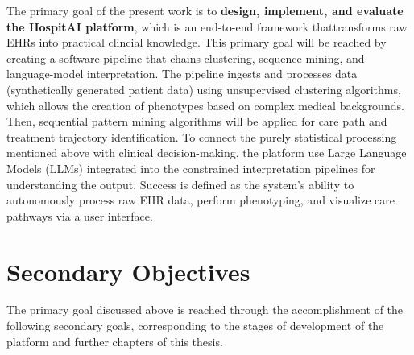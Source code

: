The primary goal of the present work is to \textbf{design, implement, and evaluate the HospitAI platform}, which is an end-to-end framework thattransforms raw EHRs into practical clincial knowledge. This primary goal will be reached by creating a software pipeline that chains clustering, sequence mining, and language-model interpretation. The pipeline ingests and processes data (synthetically generated patient data) using unsupervised clustering algorithms, which allows the creation of phenotypes based on complex medical backgrounds. Then, sequential pattern mining algorithms will be applied for care path and treatment trajectory identification. To connect the purely statistical processing mentioned above with clinical decision-making, the platform use Large Language Models (LLMs) integrated into the constrained interpretation pipelines for understanding the output. Success is defined as the system's ability to autonomously process raw EHR data, perform phenotyping, and visualize care pathways via a user interface.

\section{Secondary Objectives}

The primary goal discussed above is reached through the accomplishment of the following secondary goals, corresponding to the stages of development of the platform and further chapters of this thesis.


